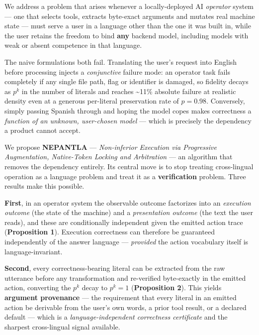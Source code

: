 
We address a problem that arises whenever a locally-deployed AI \emph{operator} system --- one that selects tools, extracts byte-exact arguments and mutates real machine state --- must serve a user in a language other than the one it was built in, while the user retains the freedom to bind \textbf{any} backend model, including models with weak or absent competence in that language.

The naive formulations both fail. Translating the user's request into English before processing injects a \emph{conjunctive} failure mode: an operator task fails completely if any single file path, flag or identifier is damaged, so fidelity decays as $p^{k}$ in the number of literals and reaches \textasciitilde{}11\% absolute failure at realistic density even at a generous per-literal preservation rate of $p=0.98$. Conversely, simply passing Spanish through and hoping the model copes makes correctness a \emph{function of an unknown, user-chosen model} --- which is precisely the dependency a product cannot accept.

We propose \textbf{NEPANTLA} --- \emph{Non-inferior Execution via Progressive Augmentation, Native-Token Locking and Arbitration} --- an algorithm that removes the dependency entirely. Its central move is to stop treating cross-lingual operation as a language problem and treat it as a \textbf{verification} problem. Three results make this possible.

\textbf{First}, in an operator system the observable outcome factorizes into an \emph{execution outcome} (the state of the machine) and a \emph{presentation outcome} (the text the user reads), and these are conditionally independent given the emitted action trace (\textbf{Proposition 1}). Execution correctness can therefore be guaranteed independently of the answer language --- \emph{provided} the action vocabulary itself is language-invariant.

\textbf{Second}, every correctness-bearing literal can be extracted from the raw utterance before any transformation and re-verified byte-exactly in the emitted action, converting the $p^{k}$ decay to $p^{k}=1$ (\textbf{Proposition 2}). This yields \textbf{argument provenance} --- the requirement that every literal in an emitted action be derivable from the user's own words, a prior tool result, or a declared default --- which is a \emph{language-independent correctness certificate} and the sharpest cross-lingual signal available.

